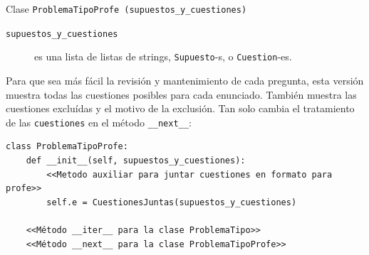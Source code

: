 \documentclass[10pt,a4paper]{report}
\begin{document}
Clase \texttt{ProblemaTipoProfe (supuestos\_y\_cuestiones)}
\begin{description}
\item[{\texttt{supuestos\_y\_cuestiones}}] es una lista de listas de strings, \texttt{Supuesto}-s, o \texttt{Cuestion}-es.
\end{description}
Para que sea más fácil la revisión y mantenimiento de cada pregunta, esta versión muestra todas las cuestiones posibles para cada enunciado. 
También muestra las cuestiones excluídas y el motivo de la exclusión. Tan solo cambia el tratamiento de las \texttt{cuestiones} en el método \texttt{\_\_next\_\_}:
\begin{verbatim}
class ProblemaTipoProfe:
    def __init__(self, supuestos_y_cuestiones):
        <<Metodo auxiliar para juntar cuestiones en formato para profe>>
        self.e = CuestionesJuntas(supuestos_y_cuestiones)

    <<Método __iter__ para la clase ProblemaTipo>>
    <<Método __next__ para la clase ProblemaTipoProfe>>
\end{verbatim}
\end{document}
